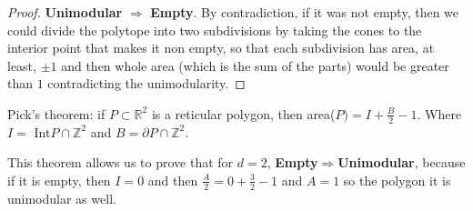 \begin{proof}
\textbf{Unimodular} $\Rightarrow$ \textbf{Empty}. By contradiction, if it was not empty, then we could divide the polytope into two subdivisions by taking the cones to the interior point that makes it non empty, so that each subdivision has area, at least, $\pm 1$ and then whole area (which is the sum of the parts) would be greater than $1$ contradicting the unimodularity.
\end{proof}
\begin{thm}
Pick's theorem: if $P\subset\mathbb{R}^2$ is a reticular polygon, then area($P)=I+\frac{B}{2}-1$. Where $I=$ Int$P\cap\mathbb{Z}^2$ and $B=\partial P\cap\mathbb{Z}^2$.
\end{thm}

This theorem allows us to prove that for $d=2$, \textbf{Empty}$\Rightarrow$\textbf{Unimodular}, because if it is empty, then $I=0$ and then $\frac{A}{2}=0+\frac{3}{2}-1$ and $A=1$ so the polygon it is unimodular as well.



